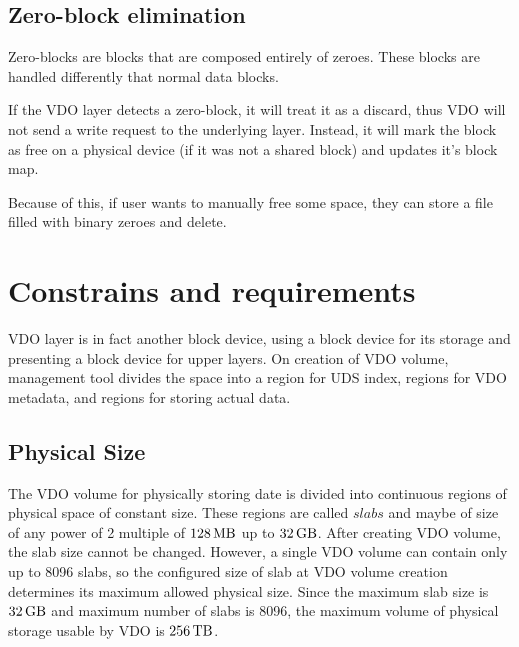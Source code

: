 \documentclass[
  color, %
  table, %
  lof,   %
  lot,   %
]{fithesis3}
\begin{document}
\subsection{Zero-block elimination}
Zero-blocks are blocks that are composed entirely of zeroes. These blocks are handled differently that normal data blocks.

If the VDO layer detects a zero-block, it will treat it as a discard, thus VDO will not send a write request to the underlying layer. Instead, it will mark the block as free on a physical device (if it was not a shared block) and updates it's block map.

Because of this, if user wants to manually free some space, they can store a file filled with binary zeroes and delete.


\section{Constrains and requirements}

VDO layer is in fact another block device, using a block device for its storage and presenting a block device for upper layers. On creation of VDO volume, management tool divides the space into a region for UDS index, regions for VDO metadata, and regions for storing actual data.



\subsection{Physical Size}
The VDO volume for physically storing date is divided into continuous regions of physical space of constant size. These regions are called $slabs$ and maybe of size of any power of 2 multiple of $\SI{128}{\mega\byte}$  up to $\SI{32}{\giga\byte}$. After creating VDO volume, the slab size cannot be changed. However, a single VDO volume can contain only up to 8096 slabs, so the configured size of slab at VDO volume creation determines its maximum allowed physical size. Since the maximum slab size is $\SI{32}{\giga\byte}$ and maximum number of slabs is 8096, the maximum volume of physical storage usable by VDO is $\SI{256}{\tera\byte}$.

\end{document}
